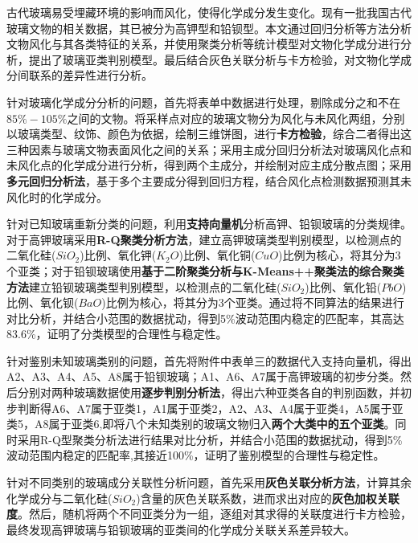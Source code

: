 \documentclass{my_paper}
\begin{document}
\newpage

\begin{center}
\lunwenbiaoti 

\vspace{2ex}
\zhaiyao
\end{center}

古代玻璃易受埋藏环境的影响而风化，使得化学成分发生变化。现有一批我国古代玻璃文物的相关数据，其已被分为高钾型和铅钡型。本文通过回归分析等方法分析文物风化与其各类特征的关系，并使用聚类分析等统计模型对文物化学成分进行分析，提出了玻璃亚类判别模型。最后结合灰色关联分析与卡方检验，对文物化学成分间联系的差异性进行分析。

针对玻璃化学成分分析的问题，首先将表单中数据进行处理，剔除成分之和不在$85\%-105\%$之间的文物。将采样点对应的玻璃文物分为风化与未风化两组，分别以玻璃类型、纹饰、颜色为依据，绘制三维饼图，进行\textbf{卡方检验}，综合二者得出这三种因素与玻璃文物表面风化之间的关系；采用主成分回归分析法对玻璃风化点和未风化点的化学成分进行分析，得到两个主成分，并绘制对应主成分散点图；采用\textbf{多元回归分析法}，基于多个主要成分得到回归方程，结合风化点检测数据预测其未风化时的化学成分。

针对已知玻璃重新分类的问题，利用\textbf{支持向量机}分析高钾、铅钡玻璃的分类规律。对于高钾玻璃采用\textbf{R-Q聚类分析方法}，建立高钾玻璃类型判别模型，以检测点的二氧化硅($SiO_2$)比例、氧化钾($K_2O$)比例、氧化铜($CuO$)比例为核心，将其分为3个亚类；对于铅钡玻璃使用\textbf{基于二阶聚类分析与K-Means++聚类法的综合聚类方法}建立铅钡玻璃类型判别模型，以检测点的二氧化硅($SiO_2$)比例、氧化铅($PbO$)比例、氧化钡($BaO$)比例为核心，将其分为3个亚类。通过将不同算法的结果进行对比分析，并结合小范围的数据扰动，得到5\%波动范围内稳定的匹配率，其高达83.6\%，证明了分类模型的合理性与稳定性。

针对鉴别未知玻璃类别的问题，首先将附件中表单三的数据代入支持向量机，得出A2、A3、A4、A5、A8属于铅钡玻璃；A1、A6、A7属于高钾玻璃的初步分类。然后分别对两种玻璃数据使用\textbf{逐步判别分析法}，得出六种亚类各自的判别函数，并初步判断得A6、A7属于亚类1，A1属于亚类2，A2、A3、A4属于亚类4，A5属于亚类5，A8属于亚类6,即将八个未知类别的玻璃文物归入\textbf{两个大类中的五个亚类}。同时采用R-Q型聚类分析法进行结果对比分析，并结合小范围的数据扰动，得到5\%波动范围内稳定的匹配率,其接近100\%，证明了鉴别模型的合理性与稳定性。

针对不同类别的玻璃成分关联性分析问题，首先采用\textbf{灰色关联分析方法}，计算其余化学成分与二氧化硅($SiO_2$)含量的灰色关联系数，进而求出对应的\textbf{灰色加权关联度}。然后，随机将两个不同亚类分为一组，逐组对其求得的关联度进行卡方检验，最终发现高钾玻璃与铅钡玻璃的亚类间的化学成分关联关系差异较大。
\end{document}
